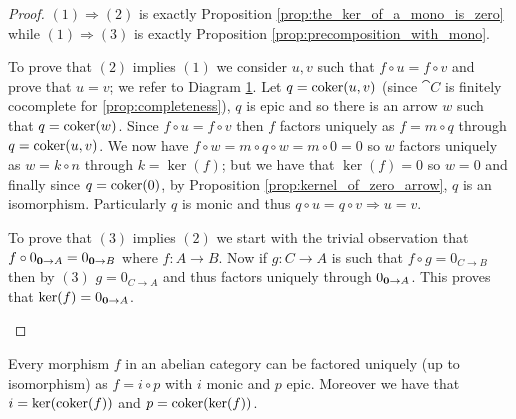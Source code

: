 \begin{proof}
  \((1)\Rightarrow(2)\) is exactly Proposition \ref{prop:the_ker_of_a_mono_is_zero} while \((1)\Rightarrow(3)\) is exactly Proposition \ref{prop:precomposition_with_mono}.

  To prove that \((2)\) implies \((1)\) we consider \(u,v\) such that \(f\circ u = f\circ v\) and prove that \(u = v\); we refer to Diagram \ref{diagram:mono}. Let \(q=\operatorname{coker}(u,v)\) (since \(\cat{C}\) is finitely cocomplete for \ref{prop:completeness}), \(q\) is epic and so there is an arrow \(w\) such that \(q = \operatorname{coker}(w)\). Since \(f\circ u = f\circ v\) then \(f\) factors uniquely as \(f = m\circ q\) through \(q = \operatorname{coker}(u, v)\). We now have \(f\circ w = m\circ q\circ w = m\circ 0 = 0\) so \(w\) factors uniquely as \(w=k\circ n\) through \(k = \ker(f)\); but we have that \(\ker(f) = 0\) so \(w = 0\) and finally since \(q = \operatorname{coker}(0)\), by Proposition \ref{prop:kernel_of_zero_arrow}, \(q\) is an isomorphism. Particularly \(q\) is monic and thus \(q\circ u =q\circ v\Rightarrow u = v\).
  
  To prove that \((3)\) implies \((2)\) we start with the trivial observation that \(f\circ 0_{{\bf 0}\to A} = 0_{{\bf 0}\to B}\) where \(f\colon A\to B\). Now if \(g\colon C\to A\) is such that \(f\circ g = 0_{C\to B}\) then by \((3)\) \(g = 0_{C\to A}\) and thus factors uniquely through \(0_{{\bf 0}\to A}\). This proves that \(\ker(f) = 0_{{\bf 0}\to A}\).
  \begin{figure}[h]
    
    \caption{}
    \label{diagram:mono}
  \end{figure}
\end{proof}

\begin{theorem}
  \label{teo:epi_mono_factorization}
  Every morphism \(f\) in an abelian category can be factored uniquely (up to isomorphism) as \(f = i\circ p\) with \(i\) monic and \(p\) epic. Moreover we have that \(i = \ker(\operatorname{coker}(f))\) and \(p = \operatorname{coker}(\ker(f))\).
\end{theorem}

\begin{figure}[h]
  
  \caption{}
  \label{diagram:factorization}
\end{figure}

